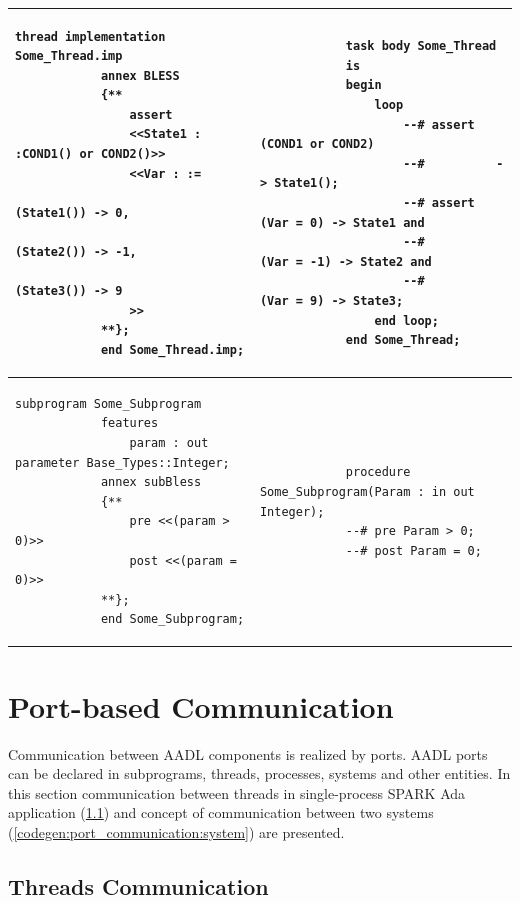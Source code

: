 \begin{center}
\begin{longtable}{| p{3in} | p{3in} |}
		\\ \hline

		\begin{lstlisting}[language=bless]
			thread implementation Some_Thread.imp
			annex BLESS 
			{**
				assert
				<<State1 : :COND1() or COND2()>>
				<<Var : :=
  								(State1()) -> 0,
  								(State2()) -> -1,
  								(State3()) -> 9
				>>
			**};
			end Some_Thread.imp;
		\end{lstlisting} 
		& 
		\begin{lstlisting}
			task body Some_Thread
			is
			begin
				loop
					--# assert (COND1 or COND2)
					--#          -> State1();
					--# assert (Var = 0) -> State1 and
					--#        (Var = -1) -> State2 and
					--#        (Var = 9) -> State3;
				end loop;
			end Some_Thread;
		\end{lstlisting} 

		\\ \hline

		\begin{lstlisting}[language=bless]
			subprogram Some_Subprogram
			features 
				param : out parameter Base_Types::Integer;
			annex subBless
			{**
				pre <<(param > 0)>>
				post <<(param = 0)>>
			**};
			end Some_Subprogram;
		\end{lstlisting} 
		& 
		\begin{lstlisting}
			procedure Some_Subprogram(Param : in out Integer);
		    --# pre Param > 0;
		    --# post Param = 0;
		\end{lstlisting} 
		
	\end{longtable}
\end{center}
\doublespacing


\section{Port-based Communication}
\label{codegen:port_communication}

Communication between AADL components is realized by ports. AADL ports can be declared in subprograms, threads, processes, systems and other entities. In this section communication between threads in single-process SPARK Ada application (\ref{codegen:port_communication:thread}) and concept of communication between two systems (\ref{codegen:port_communication:system}) are presented. 


\subsection{Threads Communication}
\label{codegen:port_communication:thread}

